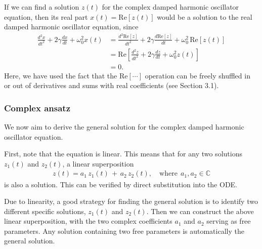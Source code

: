 \documentclass[10pt,a4paper]{article}
\begin{document}
If we can find a solution $z(t)$ for the complex damped harmonic
oscillator equation, then its real part $x(t) = \mathrm{Re}[z(t)]$
would be a solution to the real damped harmonic oscillator equation,
since
\begin{align}
  \frac{d^2 x}{dt^2} + 2\gamma \frac{dx}{dt} + \omega_0^2 x(t) &= \frac{d^2 \mathrm{Re}[z]}{dt^2} + 2\gamma \frac{d \mathrm{Re}[z]}{dt} + \omega_0^2 \, \mathrm{Re}[z(t)] \\
  &= \mathrm{Re}\left[\frac{d^2 z}{dt^2} + 2\gamma \frac{dz}{dt} + \omega_0^2 z(t)\right] \\
  &= 0.
\end{align}
Here, we have used the fact that the $\mathrm{Re}[\cdots]$ operation
can be freely shuffled in or out of derivatives and sums with real
coefficients (see Section 3.1).

\subsubsection{Complex ansatz}
\label{complex-ansatz}

We now aim to derive the general solution for the complex damped
harmonic oscillator equation.

First, note that the equation is linear. This means that for any two
solutions $z_1(t)$ and $z_2(t)$, a linear superposition
\begin{align}
  z(t) = a_1 \, z_1(t) \,+\, a_2 \,z_2(t),\quad \mathrm{where}\;\,
  a_1, a_2 \in \mathbb{C}
\end{align}
is also a solution. This can be verified by direct substitution into the ODE.

Due to linearity, a good strategy for finding the general solution is
to identify two different specific solutions, $z_1(t)$ and
$z_2(t)$. Then we can construct the above linear superposition, with
the two complex coefficients $a_1$ and $a_2$ serving as free
parameters. Any solution containing two free parameters is
automatically the general solution.
\end{document}
